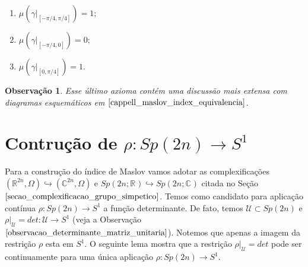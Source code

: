 \documentclass[12pt]{book}
\newtheorem{observacao}[teorema]{Observação}
\newcommand{\circulo}{S^{1}}
\newcommand{\complexo}[1]{\mathbb{C}^{#1}}
\newcommand{\gruposimpletico}[1]{Sp(#1)}
\newcommand{\gruposimpleticocomplexo}[1]{Sp(#1; \complexo{})}
\newcommand{\gruposimpleticoreal}[1]{Sp(#1;\reta)}
\newcommand{\matrizSimpleticaOrtogonal}{\mathcal{U}}
\newcommand{\real}[1]{\mathbb{R}^{#1}}
\newcommand{\reta}{\real{}}
\begin{document}
\begin{enumerate}
		\begin{enumerate}
			\item $\mu(\gamma|_{[-\pi/4, \pi/4]}) = 1;$
			\item $\mu(\gamma|_{[-\pi/4, 0]}) = 0;$
			\item $\mu(\gamma|_{[0, \pi/4]}) = 1.$	
		\end{enumerate}
		\begin{observacao}
			Esse último axioma contém uma discussão mais extensa com diagramas esquemáticos em $\cite{cappell_maslov_index_equivalencia}$.
		\end{observacao}
	\end{enumerate}
	
	\section{Contrução de $\rho: \gruposimpletico{2n} \to \circulo$}
	Para a construção do índice de Maslov vamos adotar as complexificações $(\real{2n}, \Omega) \hookrightarrow (\complexo{2n}, \Omega)$ e $\gruposimpleticoreal{2n} \hookrightarrow \gruposimpleticocomplexo{2n}$ citada no Seção $\ref{secao_complexificacao_grupo_simpetico}$. Temos como candidato para aplicação contínua $\rho: \gruposimpletico{2n} \to \circulo$ a função determinante. De fato, temos $\matrizSimpleticaOrtogonal \subset \gruposimpletico{2n}$ e $\rho|_{\matrizSimpleticaOrtogonal}=det:\matrizSimpleticaOrtogonal \to \circulo$ (veja a Observação $\ref{observacao_determinante_matriz_unitaria}$). Notemos que apenas a imagem da restrição $\rho$ esta em $\circulo$. O seguinte lema mostra que a restrição $\rho|_{\matrizSimpleticaOrtogonal} = det$ pode ser continuamente para uma única aplicação  $\rho: \gruposimpletico{2n} \to \circulo$.
	
\end{document}
